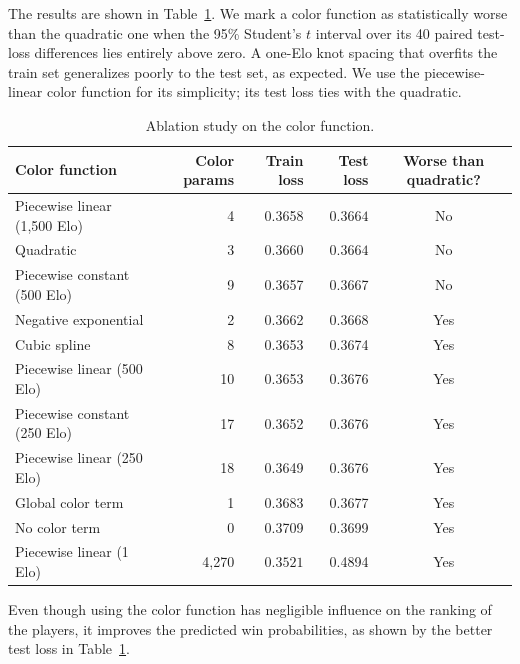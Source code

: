 \documentclass{article}
\begin{document}
The results are shown in Table~\ref{tab:color-function-ablation}.
We mark a color function as statistically worse than the quadratic one when
the 95\% Student's $t$ interval over its 40 paired test-loss differences lies
entirely above zero. A one-Elo knot spacing that overfits the train set generalizes poorly to the test set, as expected.
We use the piecewise-linear color function for its simplicity; its test loss ties with the quadratic.

\begin{table}[htbp]
  \caption{Ablation study on the color function.}
  \label{tab:color-function-ablation}
  \centering
  \small
  \renewcommand{\arraystretch}{1.08}
  \setlength{\tabcolsep}{4pt}
  \begin{tabular}{@{}lrrrc@{}}
    \toprule
    Color function & Color params & Train loss & Test loss & Worse than quadratic? \\
    \midrule
    Piecewise linear (1,500 Elo)     &    4 & 0.3658 & $\mathbf{0.3664}$ & No \\
    Quadratic                        &    3 & 0.3660 & $\mathbf{0.3664}$ & No \\
    Piecewise constant (500 Elo)     &    9 & 0.3657 & 0.3667 & No \\
    Negative exponential             &    2 & 0.3662 & 0.3668 & Yes \\
    Cubic spline                     &    8 & 0.3653 & 0.3674 & Yes \\
    Piecewise linear (500 Elo)       &   10 & 0.3653 & 0.3676 & Yes \\
    Piecewise constant (250 Elo)     &   17 & 0.3652 & 0.3676 & Yes \\
    Piecewise linear (250 Elo)       &   18 & 0.3649 & 0.3676 & Yes \\
    Global color term                &    1 & 0.3683 & 0.3677 & Yes \\
    No color term                    &    0 & 0.3709 & 0.3699 & Yes \\
    Piecewise linear (1 Elo)         & 4,270 & $\mathbf{0.3521}$ & 0.4894 & Yes \\
    \bottomrule
  \end{tabular}
\end{table}


Even though using the color function has negligible influence on the ranking of the players, it improves the predicted win probabilities, as shown by the better test loss in Table~\ref{tab:color-function-ablation}.
\end{document}

